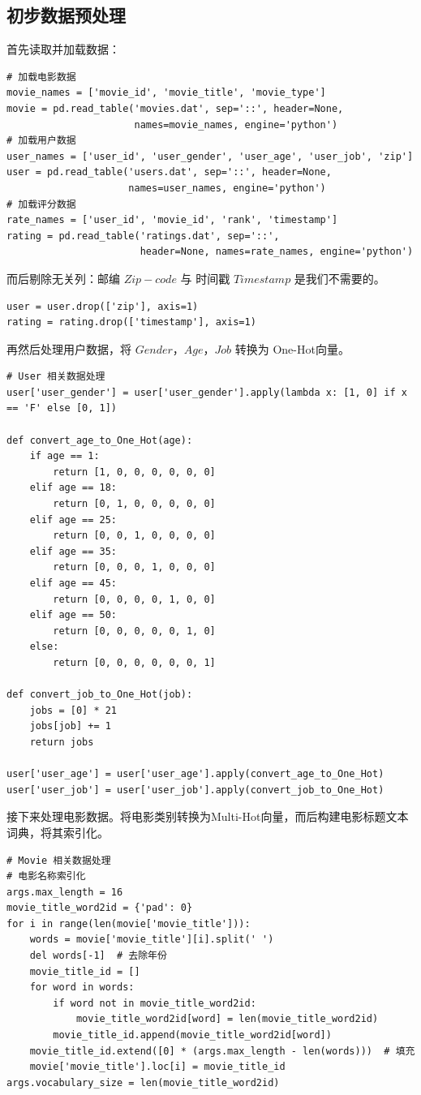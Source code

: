 \subsection{初步数据预处理}
\xiaosi\begin{spacing}{1.5}
首先读取并加载数据：
\begin{lstlisting}
# 加载电影数据
movie_names = ['movie_id', 'movie_title', 'movie_type'] 
movie = pd.read_table('movies.dat', sep='::', header=None,
                      names=movie_names, engine='python') 
# 加载用户数据
user_names = ['user_id', 'user_gender', 'user_age', 'user_job', 'zip']
user = pd.read_table('users.dat', sep='::', header=None,
                     names=user_names, engine='python') 
# 加载评分数据                     
rate_names = ['user_id', 'movie_id', 'rank', 'timestamp']
rating = pd.read_table('ratings.dat', sep='::',
                       header=None, names=rate_names, engine='python')

\end{lstlisting}\par
而后剔除无关列：邮编 $Zip-code$ 与 时间戳 $Timestamp$ 是我们不需要的。
\begin{lstlisting}
user = user.drop(['zip'], axis=1)
rating = rating.drop(['timestamp'], axis=1)
\end{lstlisting}\par
再然后处理用户数据，将 $Gender$，$Age$，$Job$ 转换为 One-Hot向量。
\begin{lstlisting}
# User 相关数据处理
user['user_gender'] = user['user_gender'].apply(lambda x: [1, 0] if x == 'F' else [0, 1])

def convert_age_to_One_Hot(age):
    if age == 1:
        return [1, 0, 0, 0, 0, 0, 0]
    elif age == 18:
        return [0, 1, 0, 0, 0, 0, 0]
    elif age == 25:
        return [0, 0, 1, 0, 0, 0, 0]
    elif age == 35:
        return [0, 0, 0, 1, 0, 0, 0]
    elif age == 45:
        return [0, 0, 0, 0, 1, 0, 0]
    elif age == 50:
        return [0, 0, 0, 0, 0, 1, 0]
    else:
        return [0, 0, 0, 0, 0, 0, 1]

def convert_job_to_One_Hot(job):
    jobs = [0] * 21
    jobs[job] += 1
    return jobs

user['user_age'] = user['user_age'].apply(convert_age_to_One_Hot)
user['user_job'] = user['user_job'].apply(convert_job_to_One_Hot)
\end{lstlisting}\par
接下来处理电影数据。将电影类别转换为Multi-Hot向量，而后构建电影标题文本词典，将其索引化。
\begin{lstlisting}
# Movie 相关数据处理
# 电影名称索引化
args.max_length = 16
movie_title_word2id = {'pad': 0}
for i in range(len(movie['movie_title'])):
    words = movie['movie_title'][i].split(' ')
    del words[-1]  # 去除年份
    movie_title_id = []
    for word in words:
        if word not in movie_title_word2id:
            movie_title_word2id[word] = len(movie_title_word2id)
        movie_title_id.append(movie_title_word2id[word])
    movie_title_id.extend([0] * (args.max_length - len(words)))  # 填充
    movie['movie_title'].loc[i] = movie_title_id
args.vocabulary_size = len(movie_title_word2id)


\end{lstlisting}
\end{spacing}
